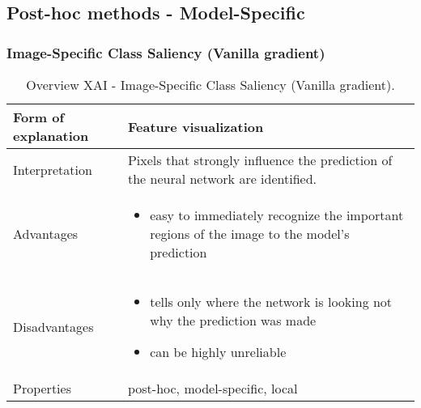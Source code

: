 \subsection{Post-hoc methods - Model-Specific}


\subsubsection{Image-Specific Class Saliency (Vanilla gradient)}

\begin{table}[H]
  \centering
  \begin{tabular}{|p{}|p{}|}
    \hline
    Form of \newline explanation & 
    Feature visualization \\
    
    \hline
    Interpretation & 
    Pixels that strongly influence the prediction of the neural network are identified. \\
    \hline
    Advantages &
    \begin{itemize}[nosep, left=0em]
        \item easy to immediately recognize the important regions of the image to the model's prediction
    \end{itemize} \\
    
    \hline
    Disadvantages &
    \begin{itemize}[nosep, left=0em]
        \item tells only where the network is looking not why the prediction was made
        \item can be highly unreliable
    \end{itemize} \\
    
    \hline
    Properties & 
    post-hoc, model-specific, local  \\
    
    \hline
  \end{tabular}
  \caption[Overview XAI - Image-Specific Class Saliency (Vanilla gradient)]{Overview XAI - Image-Specific Class Saliency (Vanilla gradient).}
\end{table}
